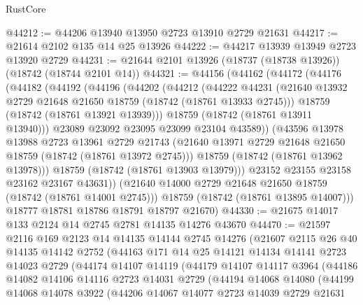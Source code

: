 \begin{lexlean}{RustCore}
\begin{coremodule}
@44212 := @44206 @13940 @13950 @2723 @13910 @2729 @21631
@44217 := @21614 @2102 @135 @14 @25 @13926
@44222 := @44217 @13939 @13949 @2723 @13920 @2729
@44231 := @21644 @2101 @13926 (@18737 (@18738 @13926)) (@18742 (@18744 @2101 @14))
@44321 := @44156
    (@44162
      (@44172
        (@44176
          (@44182
            (@44192
              (@44196
                (@44202
                  (@44212
                    (@44222
                      @44231
                      (@21640 @13932 @2729 @21648 @21650 @18759 (@18742 (@18761 @13933 @2745)))
                      @18759
                      (@18742 (@18761 @13921 @13939)))
                    @18759
                    (@18742 (@18761 @13911 @13940)))
                  @23089
                  @23092
                  @23095
                  @23099
                  @23104
                  @43589))
              (@43596
                @13978
                @13988
                @2723
                @13961
                @2729
                @21743
                (@21640 @13971 @2729 @21648 @21650 @18759 (@18742 (@18761 @13972 @2745)))
                @18759
                (@18742 (@18761 @13962 @13978)))
              @18759
              (@18742 (@18761 @13903 @13979)))
            @23152
            @23155
            @23158
            @23162
            @23167
            @43631))
        (@21640 @14000 @2729 @21648 @21650 @18759 (@18742 (@18761 @14001 @2745)))
        @18759
        (@18742 (@18761 @13895 @14007)))
      @18777
      @18781
      @18786
      @18791
      @18797
      @21670)
@44330 := @21675 @14017 @133 @2124 @14 @2745 @2781 @14135 @14276 @43670
@44470 := @21597
    @2116
    @169
    @2123
    @14
    @14135
    @14144
    @2745
    @14276
    (@21607
      @2115
      @26
      @40
      @14135
      @14142
      @2752
      (@44163
        @171
        @14
        @25
        @14121
        @14134
        @14141
        @2723
        @14023
        @2729
        (@44174
          @14107
          @14119
          (@44179
            @14107
            @14117
            @3964
            (@44186
              @14082
              @14106
              @14116
              @2723
              @14031
              @2729
              (@44194
                @14068
                @14080
                (@44199
                  @14068
                  @14078
                  @3922
                  (@44206
                    @14067
                    @14077
                    @2723
                    @14039
                    @2729
                    @21631

\end{coremodule}
\end{lexlean}
